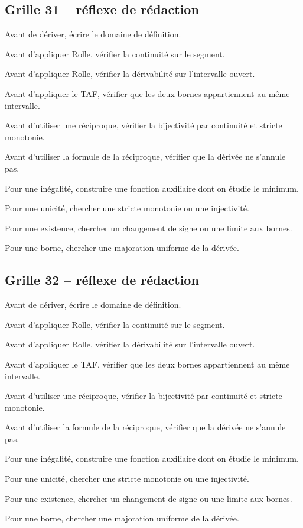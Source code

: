 \documentclass[11pt,a4paper]{article}
\begin{document}
\subsection*{Grille 31 -- réflexe de rédaction}

\begin{methodebox}

Avant de dériver, écrire le domaine de définition.

Avant d'appliquer Rolle, vérifier la continuité sur le segment.

Avant d'appliquer Rolle, vérifier la dérivabilité sur l'intervalle ouvert.

Avant d'appliquer le TAF, vérifier que les deux bornes appartiennent au même intervalle.

Avant d'utiliser une réciproque, vérifier la bijectivité par continuité et stricte monotonie.

Avant d'utiliser la formule de la réciproque, vérifier que la dérivée ne s'annule pas.

Pour une inégalité, construire une fonction auxiliaire dont on étudie le minimum.

Pour une unicité, chercher une stricte monotonie ou une injectivité.

Pour une existence, chercher un changement de signe ou une limite aux bornes.

Pour une borne, chercher une majoration uniforme de la dérivée.

\end{methodebox}

\subsection*{Grille 32 -- réflexe de rédaction}

\begin{methodebox}

Avant de dériver, écrire le domaine de définition.

Avant d'appliquer Rolle, vérifier la continuité sur le segment.

Avant d'appliquer Rolle, vérifier la dérivabilité sur l'intervalle ouvert.

Avant d'appliquer le TAF, vérifier que les deux bornes appartiennent au même intervalle.

Avant d'utiliser une réciproque, vérifier la bijectivité par continuité et stricte monotonie.

Avant d'utiliser la formule de la réciproque, vérifier que la dérivée ne s'annule pas.

Pour une inégalité, construire une fonction auxiliaire dont on étudie le minimum.

Pour une unicité, chercher une stricte monotonie ou une injectivité.

Pour une existence, chercher un changement de signe ou une limite aux bornes.

Pour une borne, chercher une majoration uniforme de la dérivée.

\end{methodebox}
\end{document}
